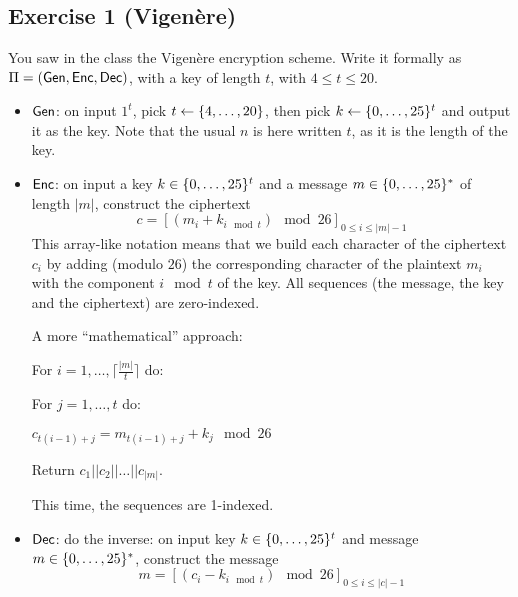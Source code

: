 

\section{}

\subsection{Exercise 1 (Vigenère)}

You saw in the class the Vigenère encryption scheme.
Write it formally as $\Pi=(\operatorname{\mathsf{Gen}}, \operatorname{\mathsf{Enc}}, \operatorname{\mathsf{Dec}})$, with a key of length $t$, with $4 \le t \le 20$.


\begin{solution}
	\begin{itemize}
		\item $\operatorname{\mathsf{Gen}}$: on input $1^t$, pick $t \leftarrow \{4, \dots, 20\}$,
		then pick $k \leftarrow \{0,\dots, 25\}^t$ and output it as the key.
		Note that the usual $n$ is here written $t$, as it is the length of the key.

		\item $\operatorname{\mathsf{Enc}}$: on input a key $k\in \{0,\dots, 25\}^t$ and a message $m\in \{0,\dots, 25\}^*$ of length $|m|$, construct the ciphertext
		\[ c = [(m_i + k_{i \mod t}) \mod 26]_{0 \le i \le |m|-1} \]
		This array-like notation means that we build each character of the ciphertext $c_i$ by adding (modulo $26$) the corresponding character of the plaintext $m_i$ with the component $i \mod t$ of the key.
		All sequences (the message, the key and the ciphertext) are zero-indexed.

		A more ``mathematical'' approach:

		For $i=1, \dots, \lceil \frac{|m|}{t} \rceil$ do:

		\hspace{20pt}For $j=1, \dots, t$ do:

		\hspace{20pt}\hspace{20pt}$c_{t(i-1)+j} = m_{t(i-1)+j} + k_j \mod 26$

		Return $c_1 || c_2 || \dots || c_{|m|}$.

		This time, the sequences are 1-indexed.

		\item $\operatorname{\mathsf{Dec}}$: do the inverse: on input key $k \in \{0,\dots, 25\}^t$ and message $m\in\{0,\dots, 25\}^*$, construct the message
		\[ m = [(c_i - k_{i \mod t}) \mod 26]_{0 \le i \le |c|-1} \]
	\end{itemize}
\end{solution}



